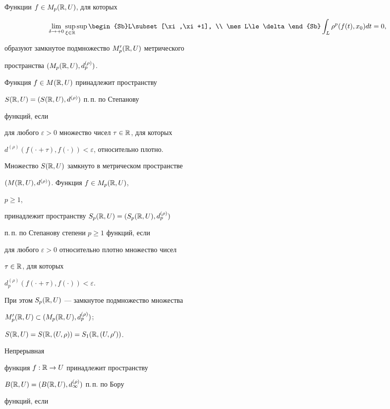 Функции $f\in M_p(\Bbb R,U)$, для которых


$$


\lim_{\delta\to+0}\sup_{\xi\in\Bbb R}


\sup\begin{Sb}L\subset[\xi,\xi+1], \\ \mes L\le\delta\end{Sb}


\int_L \rho^p(f(t),x_0)dt=0,


$$


образуют замкнутое подмножество $M'_p(\Bbb R,U)$ метрического


пространства $(M_p(\Bbb R,U),d^{(\rho)}_p)$.





Функция $f\in M(\Bbb R,U)$ принадлежит пространству


$S(\Bbb R,U)=(S(\Bbb R,U),d^{(\rho)})$ п.\,п. по Степанову


функций, если


для любого $\varepsilon>0$ множество чисел $\tau\in\Bbb R$, для которых


$d^{(\rho)}(f(\cdot+\tau),f(\cdot))<\varepsilon$, относительно плотно.


Множество $S(\Bbb R,U)$ замкнуто в метрическом пространстве


$(M(\Bbb R,U),d^{(\rho)})$. Функция $f\in M_p(\Bbb R,U)$,


$p\ge 1$,


принадлежит пространству $S_p(\Bbb R,U)=(S_p(\Bbb R,U),d^{(\rho)}_p)$


п.\,п. по Степанову степени $p\ge 1$ функций, если


для любого $\varepsilon>0$ относительно плотно множество чисел


$\tau\in\Bbb R$, для которых


$d^{(\rho)}_p(f(\cdot+\tau),f(\cdot))<\varepsilon$.


При этом $S_p(\Bbb R,U)$ --- замкнутое подмножество множества


$M'_p(\Bbb R,U)\subset(M_p(\Bbb R,U),d^{(\rho)}_p)$;


$S(\Bbb R,U)=S(\Bbb R,(U,\rho))=S_1(\Bbb R,(U,\rho'))$.


Непрерывная


функция $f:\Bbb R\to U$ принадлежит пространству


$B(\Bbb R,U)=(B(\Bbb R,U),d^{(\rho)}_\infty)$ п.\,п. по Бору


функций, если


